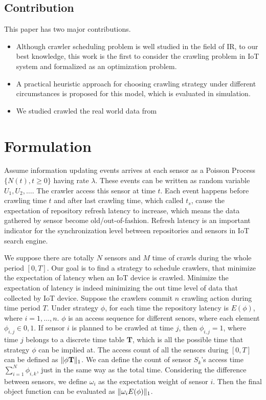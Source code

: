 \documentclass[conference]{IEEEtran}
\begin{document}
\subsection{Contribution}
This paper has two major contributions.
\begin{itemize}
\item Although crawler scheduling problem is well studied in the field of IR, to our best knowledge, this work is the first to consider the crawling problem in IoT system and formalized as an optimization problem.
\item A practical heuristic approach for choosing crawling strategy under different circumstances is proposed for this model, which is evaluated in simulation.
\item We studied crawled the real world data from 
\end{itemize}

\section{Formulation}
Assume information updating events arrives at each sensor as a Poisson Process $\{N(t), t\geq0\}$ having rate $\lambda$. 
These events can be written as random variable $U_1, U_2, \ldots$. The crawler access this sensor at time $t$. Each event happens before crawling time $t$ and after last crawling time, which called $t_s$, cause the  expectation of repository refresh latency to increase, which means the data gathered by sensor become old/out-of-fashion. Refresh latency is an important indicator for the synchronization level between repositories and sensors in IoT search engine.

We suppose there are totally $N$ sensors and $M$ time of crawls during the whole period $[0, T]$. Our goal is to find a strategy to schedule crawlers, that minimize the expectation of latency when an IoT device is crawled. 
Minimize the expectation of latency is indeed minimizing the out time level of data that collected by IoT device. Suppose the crawlers commit $n$ crawling action during time period $T$. 
Under strategy $\phi$, for each time the repository latency is $E(\phi)$, where $i=1,\ldots,n$. 
$\phi$ is an access sequence for different senors, where each element $\phi_{i,j}\in{0,1}$. 
If sensor $i$ is planned to be crawled at time $j$, then $\phi_{i,j}=1$, where time $j$ belongs to a discrete time table $\mathbf{T}$, which is all the possible time that strategy $\phi$ can be implied at.
The access count of all the sensors during $[0, T]$ can be defined as $\Arrowvert\phi\mathbf{T} \Arrowvert_{1}$. We can define the count of sensor $S_k$'s access time $\sum_{i=1}^{N}\phi_{i,k}$, just in the same way as the total time. 
Considering the difference between sensors, we define $\omega_i$ as the expectation weight of sensor $i$. Then the final object function can be evaluated as $\Arrowvert \omega_i E(\phi) \Arrowvert_{1}$.
\end{document}
